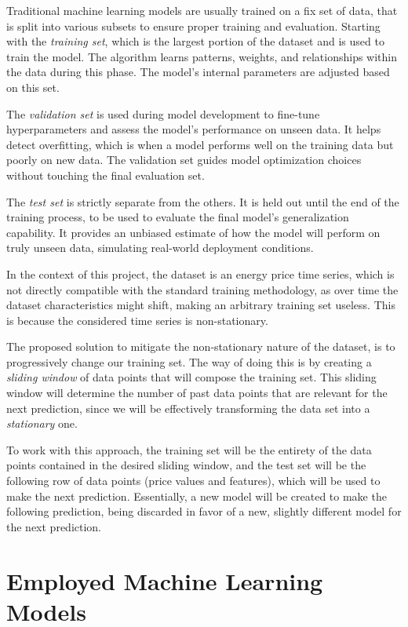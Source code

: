\documentclass[12pt]{report} %
\begin{document}
Traditional machine learning models are usually trained on a fix set of data, that is split into various subsets to ensure proper training and evaluation. Starting with the \textit{training set}, which is the largest portion of the dataset and is used to train the model. The algorithm learns patterns, weights, and relationships within the data during this phase. The model’s internal parameters are adjusted based on this set.

The \textit{validation set} is used during model development to fine-tune hyperparameters and assess the model’s performance on unseen data. It helps detect overfitting, which is when a model performs well on the training data but poorly on new data. The validation set guides model optimization choices without touching the final evaluation set.

The \textit{test set} is strictly separate from the others. It is held out until the end of the training process, to be used to evaluate the final model’s generalization capability. It provides an unbiased estimate of how the model will perform on truly unseen data, simulating real-world deployment conditions.

In the context of this project, the dataset is an energy price time series, which is not directly compatible with the standard training methodology, as over time the dataset characteristics might shift, making an arbitrary training set useless. This is because the considered time series is \textit{}{non-stationary}.

The proposed solution to mitigate the \textit{}{non-stationary} nature of the dataset, is to progressively change our training set. The way of doing this is by creating a \textit{sliding window} of data points that will compose the training set. This sliding window will determine the number of past data points that are relevant for the next prediction, since we will be effectively transforming the data set into a \textit{stationary} one.

To work with this approach, the training set will be the entirety of the data points contained in the desired sliding window, and the test set will be the following row of data points (price values and features), which will be used to make the next prediction. Essentially, a new model will be created to make the following prediction, being discarded in favor of a new, slightly different model for the next prediction.


\section{Employed Machine Learning Models}
\end{document}
